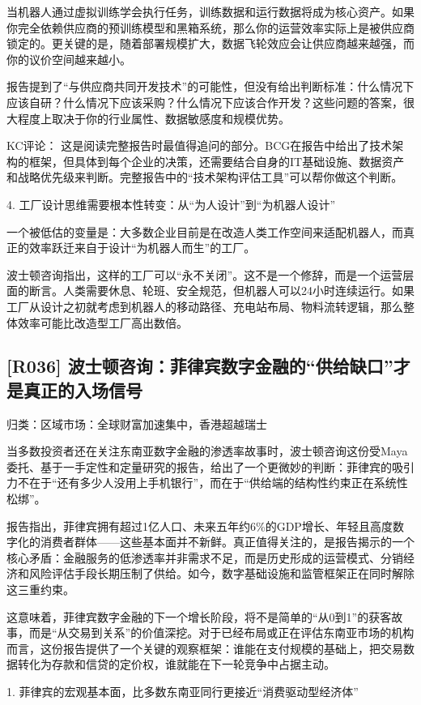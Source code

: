 \documentclass[11pt]{ctexart}
\begin{document}
当机器人通过虚拟训练学会执行任务，训练数据和运行数据将成为核心资产。如果你完全依赖供应商的预训练模型和黑箱系统，那么你的运营效率实际上是被供应商锁定的。更关键的是，随着部署规模扩大，数据飞轮效应会让供应商越来越强，而你的议价空间越来越小。

报告提到了“与供应商共同开发技术”的可能性，但没有给出判断标准：什么情况下应该自研？什么情况下应该采购？什么情况下应该合作开发？这些问题的答案，很大程度上取决于你的行业属性、数据敏感度和规模优势。

KC评论： 这是阅读完整报告时最值得追问的部分。BCG在报告中给出了技术架构的框架，但具体到每个企业的决策，还需要结合自身的IT基础设施、数据资产和战略优先级来判断。完整报告中的“技术架构评估工具”可以帮你做这个判断。

4. 工厂设计思维需要根本性转变：从“为人设计”到“为机器人设计”

一个被低估的变量是：大多数企业目前是在改造人类工作空间来适配机器人，而真正的效率跃迁来自于设计“为机器人而生”的工厂。

波士顿咨询指出，这样的工厂可以“永不关闭”。这不是一个修辞，而是一个运营层面的断言。人类需要休息、轮班、安全规范，但机器人可以24小时连续运行。如果工厂从设计之初就考虑到机器人的移动路径、充电站布局、物料流转逻辑，那么整体效率可能比改造型工厂高出数倍。

\subsection{[R036] 波士顿咨询：菲律宾数字金融的“供给缺口”才是真正的入场信号}
{\small\color{refgray}归类：区域市场：全球财富加速集中，香港超越瑞士}

当多数投资者还在关注东南亚数字金融的渗透率故事时，波士顿咨询这份受Maya委托、基于一手定性和定量研究的报告，给出了一个更微妙的判断：菲律宾的吸引力不在于“还有多少人没用上手机银行”，而在于“供给端的结构性约束正在系统性松绑”。

报告指出，菲律宾拥有超过1亿人口、未来五年约6\%的GDP增长、年轻且高度数字化的消费者群体——这些基本面并不新鲜。真正值得关注的，是报告揭示的一个核心矛盾：金融服务的低渗透率并非需求不足，而是历史形成的运营模式、分销经济和风险评估手段长期压制了供给。如今，数字基础设施和监管框架正在同时解除这三重约束。

这意味着，菲律宾数字金融的下一个增长阶段，将不是简单的“从0到1”的获客故事，而是“从交易到关系”的价值深挖。对于已经布局或正在评估东南亚市场的机构而言，这份报告提供了一个关键的观察框架：谁能在支付规模的基础上，把交易数据转化为存款和信贷的定价权，谁就能在下一轮竞争中占据主动。

1. 菲律宾的宏观基本面，比多数东南亚同行更接近“消费驱动型经济体”
\end{document}
